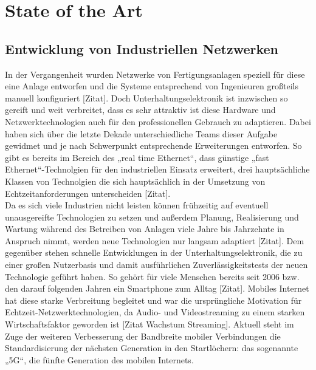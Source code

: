 \chapter{State of the Art}
\section{Entwicklung von Industriellen Netzwerken}
In der Vergangenheit wurden Netzwerke von Fertigungsanlagen speziell für diese eine Anlage entworfen und die Systeme entsprechend von Ingenieuren großteils manuell konfiguriert [Zitat]. Doch Unterhaltungselektronik ist inzwischen so gereift und weit verbreitet, dass es sehr attraktiv ist diese Hardware und Netzwerktechnologien auch für den professionellen Gebrauch zu adaptieren. Dabei haben sich über die letzte Dekade unterschiedliche Teams dieser Aufgabe gewidmet und je nach Schwerpunkt entsprechende Erweiterungen entworfen. So gibt es bereits im Bereich des „real time Ethernet“, dass günstige „fast Ethernet“-Technolgien für den industriellen Einsatz erweitert, drei hauptsächliche Klassen von Technolgien die sich hauptsächlich in der Umsetzung von Echtzeitanforderungen unterscheiden [Zitat].\\
Da es sich viele Industrien nicht leisten können frühzeitig auf eventuell unausgereifte Technologien zu setzen und außerdem Planung, Realisierung und Wartung während des Betreiben von Anlagen viele Jahre bis Jahrzehnte in Anspruch nimmt, werden neue Technologien nur langsam adaptiert [Zitat]. Dem gegenüber stehen schnelle Entwicklungen in der Unterhaltungselektronik, die zu einer großen Nutzerbasis und damit ausführlichen Zuverlässigkeitstests der neuen Technologie geführt haben. So gehört für viele Menschen bereits seit 2006 bzw. den darauf folgenden Jahren ein Smartphone zum Alltag [Zitat]. Mobiles Internet hat diese starke Verbreitung begleitet und war die ursprüngliche Motivation für Echtzeit-Netzwerktechnologien, da Audio- und Videostreaming zu einem starken Wirtschaftsfaktor geworden ist [Zitat Wachstum Streaming]. Aktuell steht im Zuge der weiteren Verbesserung der Bandbreite mobiler Verbindungen die Standardisierung der nächsten Generation in den Startlöchern: das sogenannte „5G“, die fünfte Generation des mobilen Internets.\\

